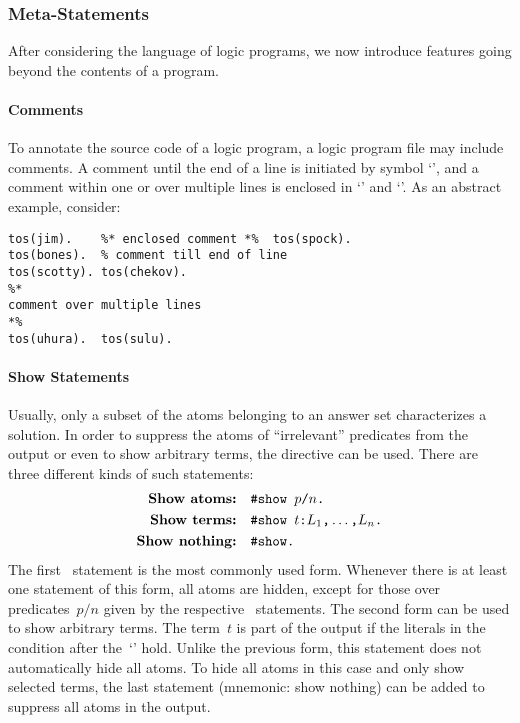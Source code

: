 \subsubsection{Meta-Statements}\label{subsec:gringo:meta}

After considering the language of logic programs,
we now introduce features going beyond the contents of a program.

\paragraph{Comments}
To annotate the source code of a logic program,
a logic program file may include comments.
A comment until the end of a line is initiated by symbol `\code{\%}',
and a comment within one or over multiple lines is enclosed
in `\code{\%*}' and `\code{*\%}'.
As an abstract example, consider:
%
\begin{lstlisting}[numbers=none,escapechar=@]
tos(jim).    %* enclosed comment *%  tos(spock).
tos(bones).  % comment till end of line
tos(scotty). tos(chekov).
%*
comment over multiple lines
*%
tos(uhura).  tos(sulu).
\end{lstlisting}

\paragraph{Show Statements}
%
Usually, only a subset of the atoms belonging
to an answer set characterizes a solution.
In order to suppress the atoms of ``irrelevant'' predicates from the output
or even to show arbitrary terms,
the  directive can be used.
There are three different kinds of such statements:
%
\begin{align*}
   \textbf{Show atoms:}   & \quad \texttt{\#show }p\texttt{/}n\texttt{.} \\
   \textbf{Show terms:}   & \quad \texttt{\#show }t\texttt{:}L_1\text{\texttt{,}}\dots\text{\texttt{,}}L_n\texttt{.} \\
   \textbf{Show nothing:} & \quad \texttt{\#show.}
\end{align*}
%
The first~ statement is the most commonly used form.
Whenever there is at least one statement of this form, all atoms are hidden,
except for those over predicates~$p/n$ given by the respective~ statements.
The second form can be used to show arbitrary terms.
The term~$t$ is part of the output if the literals in the condition after the~`\code{:}' hold.
Unlike the previous form,
this statement does not automatically hide all atoms.
To hide all atoms in this case and only show selected terms,
the last statement (mnemonic: show nothing) can be added to suppress all atoms in the output.

